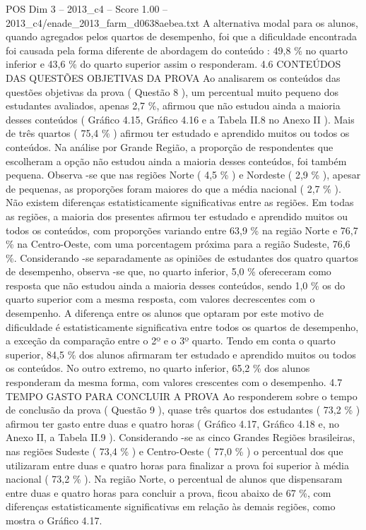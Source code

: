 \begin{textsample}{POS Dim 3 – 2013\_c4 – Score 1.00 – 2013\_c4/enade\_2013\_farm\_d0638aebea.txt}
A alternativa modal para os alunos, quando agregados pelos quartos de desempenho, foi que a dificuldade encontrada foi causada pela forma diferente de abordagem do conteúdo : 49,8 \% no quarto inferior e 43,6 \% do quarto superior assim o responderam. 4.6 CONTEÚDOS DAS QUESTÕES OBJETIVAS DA PROVA Ao analisarem os conteúdos das questões objetivas da prova ( Questão 8 ), um percentual muito pequeno dos estudantes avaliados, apenas 2,7 \%, afirmou que não estudou ainda a maioria desses conteúdos ( Gráfico 4.15, Gráfico 4.16 e a Tabela II.8 no Anexo II ).
Mais de três quartos ( 75,4 \% ) afirmou ter estudado e aprendido muitos ou todos os conteúdos.
Na análise por Grande Região, a proporção de respondentes que escolheram a opção não estudou ainda a maioria desses conteúdos, foi também pequena.
Observa -se que nas regiões Norte ( 4,5 \% ) e Nordeste ( 2,9 \% ), apesar de pequenas, as proporções foram maiores do que a média nacional ( 2,7 \% ).
Não existem diferenças estatisticamente significativas entre as regiões.
Em todas as regiões, a maioria dos presentes afirmou ter estudado e aprendido muitos ou todos os conteúdos, com proporções variando entre 63,9 \% na região Norte e 76,7 \% na Centro-Oeste, com uma porcentagem próxima para a região Sudeste, 76,6 \%.
Considerando -se separadamente as opiniões de estudantes dos quatro quartos de desempenho, observa -se que, no quarto inferior, 5,0 \% ofereceram como resposta que não estudou ainda a maioria desses conteúdos, sendo 1,0 \% os do quarto superior com a mesma resposta, com valores decrescentes com o desempenho.
A diferença entre os alunos que optaram por este motivo de dificuldade é estatisticamente significativa entre todos os quartos de desempenho, a exceção da comparação entre o 2º e o 3º quarto.
Tendo em conta o quarto superior, 84,5 \% dos alunos afirmaram ter estudado e aprendido muitos ou todos os conteúdos.
No outro extremo, no quarto inferior, 65,2 \% dos alunos responderam da mesma forma, com valores crescentes com o desempenho. 4.7 TEMPO GASTO PARA CONCLUIR A PROVA Ao responderem sobre o tempo de conclusão da prova ( Questão 9 ), quase três quartos dos estudantes ( 73,2 \% ) afirmou ter gasto entre duas e quatro horas ( Gráfico 4.17, Gráfico 4.18 e, no Anexo II, a Tabela II.9 ).
Considerando -se as cinco Grandes Regiões brasileiras, nas regiões Sudeste ( 73,4 \% ) e Centro-Oeste ( 77,0 \% ) o percentual dos que utilizaram entre duas e quatro horas para finalizar a prova foi superior à média nacional ( 73,2 \% ).
Na região Norte, o percentual de alunos que dispensaram entre duas e quatro horas para concluir a prova, ficou abaixo de 67 \%, com diferenças estatisticamente significativas em relação às demais regiões, como mostra o Gráfico 4.17.

\end{textsample}

